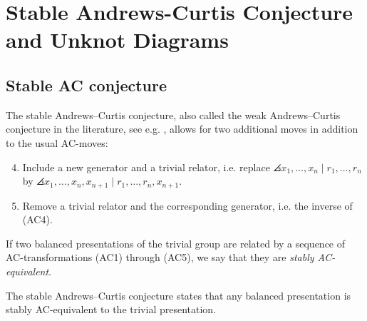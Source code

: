 
\section{Stable Andrews-Curtis Conjecture and Unknot Diagrams}

\subsection{Stable AC conjecture}

The stable Andrews--Curtis conjecture, also called the weak Andrews--Curtis conjecture in the literature, see e.g. \cite{MMS,Meier2016,Bagherifard2021}, allows for two additional moves in addition to the usual AC-moves:
\begin{enumerate}[label=(AC\arabic*)]
	\setcounter{enumi}{3}
	\item Include a new generator and a trivial relator, i.e. replace $\angles{x_1, \dots, x_n \mid r_1, \dots, r_n}$ by $\angles{x_1, \dots, x_n, x_{n+1} \mid r_1, \dots, r_n, x_{n+1}}$.
	\item Remove a trivial relator and the corresponding generator, i.e. the inverse of (AC4).
\end{enumerate}

\begin{definition}
If two balanced presentations of the trivial group are related by a sequence of AC-transformations (AC1) through (AC5), we say that they are \textit{stably AC-equivalent}.
\end{definition}
The stable Andrews--Curtis conjecture states that any balanced presentation is stably AC-equivalent to the trivial presentation.

